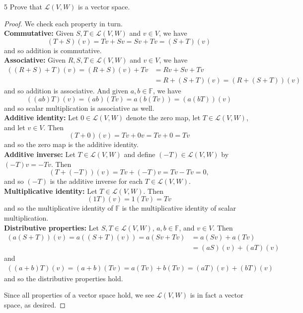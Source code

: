 \documentclass{extarticle}
\newenvironment{problem}[1]{\begin{prob*}{#1}{}}{\end{prob*}}
\newcommand{\F}{\mathbb{F}}
\newcommand{\Hom}{\mathcal{L}}
\begin{document}
\begin{problem}{5}
Prove that $\Hom(V,W)$ is a vector space.
\end{problem}
\begin{proof}
We check each property in turn.\\
\textbf{Commutative:}  Given $S,T\in\Hom(V,W)$ and $v\in V$, we have 
\begin{equation*}
(T+S)(v) = Tv + Sv = Sv + Tv = (S + T)(v)
\end{equation*} 
and so addition is commutative.\\
\textbf{Associative:} Given $R,S,T\in\Hom(V,W)$ and $v\in V$, we have 
\begin{align*}
((R + S) + T)(v) = (R+S)(v) + Tv &= Rv + Sv + Tv\\
&= R + (S + T)(v) = (R + (S + T))(v)
\end{align*}
and so addition is associative.  And given $a,b\in\F$, we have
\begin{equation*}
((ab)T)(v) = (ab)(Tv) = a(b(Tv)) = (a(bT))(v)
\end{equation*}
and so scalar multiplication is associative as well.\\
\textbf{Additive identity:} Let $0\in\Hom(V,W)$ denote the zero map, let $T\in\Hom(V,W)$, and let $v\in V$.  Then 
\begin{equation*}
(T + 0)(v) = Tv + 0v = Tv + 0 = Tv
\end{equation*}
and so the zero map is the additive identity.\\
\textbf{Additive inverse:} Let $T\in\Hom(V,W)$ and define $(-T)\in\Hom(V,W)$ by $(-T)v = -Tv$.  Then
\begin{equation*}
(T + (-T))(v) = Tv + (-T)v = Tv - Tv = 0,
\end{equation*}
and so $(-T)$ is the additive inverse for each $T\in\Hom(V,W)$.\\
\textbf{Multiplicative identity:}  Let $T\in\Hom(V,W)$.  Then
\begin{equation*}
(1T)(v) = 1(Tv) = Tv
\end{equation*}
and so the multiplicative identity of $\F$ is the multiplicative identity of scalar multiplication.\\
\textbf{Distributive properties:}  Let $S,T\in\Hom(V,W)$, $a,b\in\F$, and $v\in V$.  Then 
\begin{align*}
(a(S + T))(v) = a((S + T)(v)) = a(Sv + Tv) &= a(Sv) + a(Tv)\\
 & = (aS)(v) + (aT)(v)
\end{align*}
and
\begin{align*}
((a + b)T)(v) = (a+b)(Tv) = a(Tv) + b(Tv) = (aT)(v) + (bT)(v)
\end{align*}
and so the distributive properties hold.
\par Since all properties of a vector space hold, we see $\Hom(V,W)$ is in fact a vector space, as desired.
\end{proof}
\end{document}
